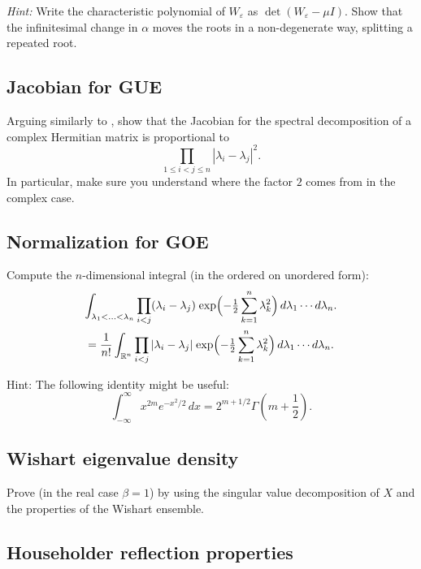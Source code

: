 \documentclass[letterpaper,11pt,oneside,reqno]{book}
\numberwithin{equation}{chapter}  %
\newcommand{\ssp}{\hspace{1pt}}
\theoremstyle{definition}
\begin{document}
\medskip
\noindent
\emph{Hint:}
Write the characteristic polynomial of \(W_{\varepsilon}\) as \(\det(W_{\varepsilon}-\mu I)\). Show that the infinitesimal change in \(\alpha\) moves the roots in a non-degenerate way, splitting a repeated root.



\subsection{Jacobian for GUE}
\label{lecture3:prob:Jacobian-GUE}

Arguing similarly to
,
show that the Jacobian for the spectral decomposition
of a complex Hermitian matrix is proportional to
\begin{equation*}
	\prod_{1\le i<j\le n}|\lambda_i-\lambda_j|^2.
\end{equation*}
In particular, make sure you understand
where the factor $2$ comes from in the complex case.

\subsection{Normalization for GOE}
\label{lecture3:prob:GOE-normalization}

Compute the $n$-dimensional integral
(in the ordered on unordered form):
\begin{multline*}
	\int_{\lambda_1<\ldots<\lambda_n } \prod_{i<j}(\lambda_i-\lambda_j)
	\ssp
	\exp\Bigl(-\tfrac{1}{2}\sum_{k=1}^n \lambda_k^2\Bigr)\,d\lambda_1\cdots d\lambda_n.\\=
	\frac{1}{n!}
	\int_{\mathbb{R}^n}
	\prod_{i<j}|\lambda_i-\lambda_j|\ssp
	\exp\Bigl(-\tfrac{1}{2}\sum_{k=1}^n \lambda_k^2\Bigr)\,d\lambda_1\cdots d\lambda_n.
\end{multline*}

\medskip
\noindent
Hint: The following identity might be useful:
\[
\int_{-\infty}^{\infty} x^{2m} e^{-x^2/2} \, dx = 2^{m+1/2} \Gamma \left( m + \frac{1}{2} \right).
\]


\subsection{Wishart eigenvalue density}

Prove  (in the real case $\beta=1$)
by using the singular
value
decomposition
of \(X\) and the properties of the Wishart ensemble.


\subsection{Householder reflection properties}
\label{lecture3:prob:householder-properties}
\end{document}
